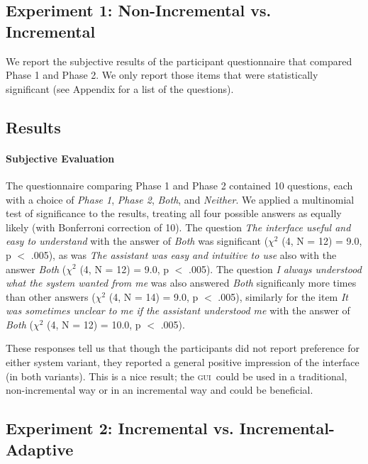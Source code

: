 \documentclass[11pt]{article}
\newcommand{\ui}[0]{\textsc{gui}}
\begin{document}
\subsection{Experiment 1: Non-Incremental vs. Incremental}
\label{section:exp1}

We report the subjective results of the participant questionnaire that compared Phase 1 and Phase 2. We only report those items that were statistically significant (see Appendix for a list of the questions). 

\subsection{Results}

\paragraph{Subjective Evaluation} The questionnaire comparing Phase 1 and Phase 2 contained 10 questions, each with a choice of \emph{Phase 1}, \emph{Phase 2}, \emph{Both}, and \emph{Neither}. We applied a multinomial test of significance to the results, treating all four possible answers as equally likely (with Bonferroni correction of 10). The question \emph{The interface useful and easy to understand} with the answer of \emph{Both} was significant ($ \chi^2 $ (4, N = 12) = 9.0, p $<$ .005), as was \emph{The assistant was easy and intuitive to use} also with the answer \emph{Both} ($ \chi^2 $ (4, N = 12) = 9.0, p $<$ .005). The question \emph{I always understood what the system wanted from me} was also answered \emph{Both} significanly more times than other answers ($ \chi^2 $ (4, N = 14) = 9.0, p $<$ .005), similarly for the item \emph{It was sometimes unclear to me if the assistant understood me} with the answer of \emph{Both} ($ \chi^2 $ (4, N = 12) = 10.0, p $<$ .005). 

These responses tell us that though the participants did not report preference for either system variant, they reported a general positive impression of the interface (in both variants). This is a nice result; the \ui\ could be used in a traditional, non-incremental way or in an incremental way and could be beneficial. 



\subsection{Experiment 2: Incremental vs. Incremental-Adaptive}
\label{section:exp2}
\end{document}
